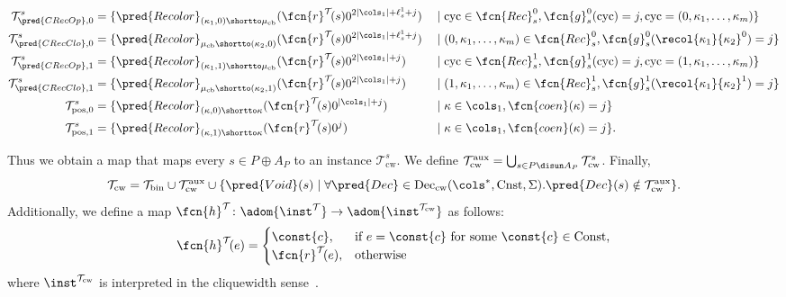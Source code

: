 \begin{definition}
\begin{itemize}
\begin{align*}
			\mathcal{T}_{\pred{CRecOp}, 0}^{s} &=  \{ \pred{Recolor}_{(\kappa_1, 0)\shortto\mu_{\mathrm{cb}}}(\fcn{r}^{\mathcal{T}}\!(s)0^{2|\cols_1| + \ell_s^1+ j}) &&\mid \mathrm{cyc}\in\fcn{Rec}_s^{0}, \fcn{g}_s^{0}(\mathrm{cyc}) = j, \mathrm{cyc} = (0, \kappa_1, \ldots, \kappa_m)  \} \\
			\mathcal{T}_{\pred{CRecClo}, 0}^{s} &=  \{ \pred{Recolor}_{\mu_{\mathrm{cb}} \shortto (\kappa_2, 0)}(\fcn{r}^{\mathcal{T}}\!(s)0^{2|\cols_1| + \ell_s^1+ j}) &&\mid (0, \kappa_1, \ldots, \kappa_m)\in\fcn{Rec}_s^{0} , \fcn{g}_s^{0}(\recol{\kappa_1}{\kappa_2}^0) = j \} \\
			\mathcal{T}_{\pred{CRecOp}, 1}^{s} &=  \{ \pred{Recolor}_{(\kappa_1, 1)\shortto\mu_{\mathrm{cb}}}(\fcn{r}^{\mathcal{T}}\!(s)0^{2|\cols_1|  + j}) &&\mid  \mathrm{cyc}\in\fcn{Rec}_s^{1}, \fcn{g}_s^{1}( \mathrm{cyc}) = j, \mathrm{cyc} = (1, \kappa_1, \ldots, \kappa_m) \} \\
			\mathcal{T}_{\pred{CRecClo}, 1}^{s} &=  \{ \pred{Recolor}_{\mu_{\mathrm{cb}} \shortto (\kappa_2, 1)}(\fcn{r}^{\mathcal{T}}\!(s)0^{2|\cols_1| + j}) &&\mid (1, \kappa_1, \ldots, \kappa_m)\in\fcn{Rec}_s^{1} , \fcn{g}_s^{1}(\recol{\kappa_1}{\kappa_2}^1) = j \} \\
			\mathcal{T}_{\mathrm{pos}, 0}^{s} &=  \{ \pred{Recolor}_{(\kappa, 0)\shortto \kappa}(\fcn{r}^{\mathcal{T}}\!(s)0^{|\cols_1|+j}) &&\mid \kappa\in\cols_1, \fcn{coen}(\kappa) = j \} \\
			\mathcal{T}_{\mathrm{pos}, 1}^{s} &=  \{ \pred{Recolor}_{(\kappa, 1)\shortto \kappa}(\fcn{r}^{\mathcal{T}}\!(s)0^{j}) &&\mid \kappa\in\cols_1, \fcn{coen}(\kappa) = j \}.
		\end{align*}
	\end{itemize}
	Thus we obtain a map that maps every $s\in P\oplus A_P$ to an instance $\mathcal{T}_{\mathrm{cw}}^s$.
	We define $\mathcal{T}_{\mathrm{cw}}^{\mathrm{aux}} = \bigcup_{s\in P\disun A_P}\mathcal{T}_{\mathrm{cw}}^{s}$. Finally,
	$$\mathcal{T}_{\mathrm{cw}} = \mathcal{T}_{\mathrm{bin}} \cup \mathcal{T}_{\mathrm{cw}}^{\mathrm{aux}} \cup \{ \pred{Void}(s) \mid \forall \pred{Dec} \in\mathrm{Dec}_{\mathrm{cw}}(\cols^*, \mathrm{Cnst}, \Sigma).  \pred{Dec}(s)\notin \mathcal{T}_{\mathrm{cw}}^{\mathrm{aux}} \}.$$%
	Additionally, we define a map $\fcn{h}^{\mathcal{T}}\colon \adom{\inst^{\mathcal{T}}} \to \adom{\inst^{\mathcal{T}_{\mathrm{cw}}}}$ as follows:
	$$\fcn{h}^{\mathcal{T}}\!(e) = \begin{cases} \const{c}, &\text{if } e = \const{c} \text{ for some } \const{c}\in\mathrm{Const}, \\ \fcn{r}^{\mathcal{T}}\!(e), &\text{otherwise} \end{cases}$$%
	where $\inst^{\mathcal{T}_{\mathrm{cw}}}$ is interpreted in the cliquewidth sense~\cite[Definition 7]{ICDT2023}.
\end{definition}
